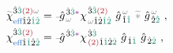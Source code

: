 \begin{subequations} \label{eq:chieff}
\begin{align}
	\textcolor{gray}{\widetilde{\textcolor{black}{\chi}}}^{ \hat{3} \textcolor{PineGreen}{\hat{3}} \textcolor{Maroon}{(2)} \mathcolor{gray}{\omega} }_{ \textcolor{NavyBlue}{\text{eff}} \hat{1} \hat{2} \textcolor{PineGreen}{\hat{1} \hat{2}} } &= \xint{{}^{}_{\mathcolor{gray}{-}}}{10}{\hat{g}}^{\;\! \hat{3} \textcolor{PineGreen}{\hat{3}} \textcolor{Plum}{*}}_{\;\! \mathcolor{gray}{\omega}} {\chi}^{\;\! \hat{3} \textcolor{PineGreen}{\hat{3}} \textcolor{Maroon}{(2)} }_{\;\! \mathcolor{gray}{\omega} \hat{1} \hat{2} \textcolor{PineGreen}{\hat{1} \hat{2}} } ~ {\hat{g}}^{\;\! \mathcolor{gray}{\omega} }_{\;\! \hat{1} \textcolor{PineGreen}{\hat{1}} } ~\mathcolor{gray}{\widetilde *}~ {\hat{g}}^{\;\! \mathcolor{gray}{\omega} }_{\;\! \hat{2} \textcolor{PineGreen}{\hat{2}} } ~, \label{eq:chieff-spectrum} \\
	{\chi}^{\hat{3} \textcolor{PineGreen}{\hat{3}} \textcolor{Maroon}{(2)} }_{\textcolor{NavyBlue}{\text{eff}} \hat{1} \textcolor{PineGreen}{\hat{1}} \hat{2} \textcolor{PineGreen}{\hat{2}} } &= \xint{{}^{}_{\mathcolor{gray}{-}}}{10}{\hat{g}}^{\;\! \hat{3} \textcolor{PineGreen}{\hat{3}} \textcolor{Plum}{*}}_{\;\! } {\chi}^{\;\! \hat{3} \textcolor{PineGreen}{\hat{3}} }_{\;\! \textcolor{Maroon}{(2)} \hat{1} \textcolor{PineGreen}{\hat{1}} \hat{2} \textcolor{PineGreen}{\hat{2}}} ~ {\hat{g}}_{\;\! \hat{1} \textcolor{PineGreen}{\hat{1}} } ~ {\hat{g}}_{\;\! \hat{2} \textcolor{PineGreen}{\hat{2}}} ~, \label{eq:chieff-discrete}
\end{align}
\end{subequations}
